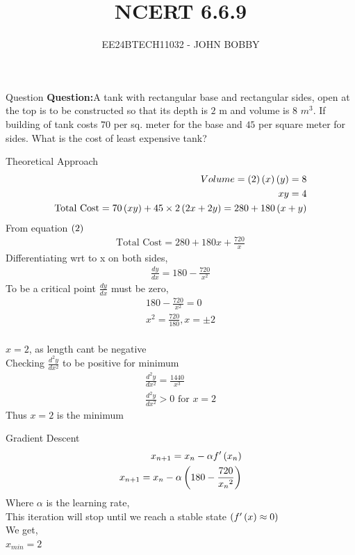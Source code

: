 \documentclass{beamer}
\begin{document}
\title{NCERT 6.6.9}
\author{EE24BTECH11032 - JOHN BOBBY}
\date{}
\frame{\titlepage}
\begin{frame}{Question}
\textbf{Question:}A tank with rectangular base and rectangular sides, open at the top is to be constructed so that its depth is $2$ m and volume is $8$ $m^3$. If building of tank costs  $70$ per sq. meter for the base and  $45$ per square meter for sides. What is the cost of least expensive tank?\\
\end{frame}
\begin{frame}{Theoretical Approach}
\begin{align}
    Volume=\left(2\right)\left(x\right)\left(y\right)=8\\
    xy=4\\
    \text{Total Cost}=70\left(xy\right)+45\times2\left(2x+2y\right)=280+180\left(x+y\right)
\end{align}
From equation $\left(2\right)$
\begin{align}
    \text{Total Cost}=280+180x+\frac{720}{x}
\end{align}
Differentiating wrt to x on both sides,
\begin{align}
    \frac{dy}{dx}=180-\frac{720}{x^2}
\end{align}
To be a critical point $\frac{dy}{dx}$  must be zero,
\begin{align}
    180-\frac{720}{x^2}=0\\
    x^2=\frac{720}{180},x=\pm 2\\
\end{align}

    
\end{frame}
\begin{frame}{}
  $x=2$, as length cant be negative\\
Checking $\frac{d^2y}{dx^2}$ to be positive for minimum
\begin{align}
    \frac{d^2y}{dx^2}=\frac{1440}{x^3}\\
    \frac{d^2y}{dx^2} >0\text{ for }  x=2
\end{align}
Thus $x=2$ is the minimum  
\end{frame}
\begin{frame}{Gradient Descent}
\begin{align}
    x_{n+1}=x_n-\alpha f^{\prime}\left(x_n\right)\\
     x_{n+1}=x_n-\alpha \left(180-\frac{720}{{x_n}^2}\right)
\end{align}
Where $\alpha$ is the learning rate,\\
This iteration will stop until we reach a stable state $\left(f^{\prime}\left(x\right) \approx0\right)$\\
We get,\\
$x_{min}=2$
\end{frame}
\end{document}
